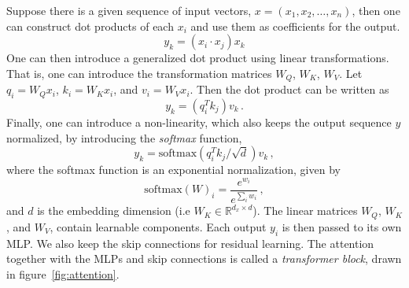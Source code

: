 Suppose there is a given sequence of input vectors, $x=(x_1,x_2,\ldots,x_n)$, then one can construct dot products of each $x_i$ and use them as coefficients for the output.
\begin{equation}
	y_k = (x_i \cdot x_j)x_k
\end{equation}
One can then introduce a generalized dot product using linear transformations. That is, one can introduce the transformation matrices $W_Q$, $W_K$, $W_V$. Let $q_i = W_Q x_i$, $k_i = W_K x_i$, and $v_i = W_V x_i$. Then the dot product can be written as 
\begin{equation}
	y_k = (q_i^T k_j)v_k\,.
\end{equation}
Finally, one can introduce a non-linearity, which also keeps the output sequence $y$ normalized, by introducing the \textit{softmax} function,
\begin{equation}
	y_k = \mathrm{softmax}(q_i^T k_j / \sqrt{d})v_k\,,
\end{equation}
where the softmax function is an exponential normalization, given by
\begin{equation}
	\mathrm{softmax}(W)_i = \frac{e^{w_i}}{e^{\sum_i{w_i}}}\,,
\end{equation}
and $d$ is the embedding dimension (i.e $W_K\in \mathbb{R}^{d_x\times d}$).
The linear matrices $W_Q$, $W_K$, and $W_V$, contain learnable components. Each output $y_i$ is then passed to its own MLP. We also keep the skip connections for residual learning. The attention together with the MLPs and skip connections is called a \textit{transformer block}, drawn in figure~\ref{fig:attention}.
